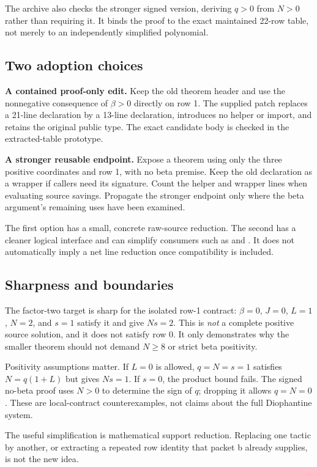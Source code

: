 \documentclass[10pt,a4paper]{article}
\newcommand{\code}[1]{\texttt{\detokenize{#1}}}
\begin{document}
The archive also checks the stronger signed version, deriving $q>0$ from $N>0$ rather than requiring it. It binds the proof to the exact maintained 22-row table, not merely to an independently simplified polynomial.

\subsection{Two adoption choices}

\textbf{A contained proof-only edit.} Keep the old theorem header and use the nonnegative consequence of $\beta>0$ directly on row 1. The supplied patch replaces a 21-line declaration by a 13-line declaration, introduces no helper or import, and retains the original public type. The exact candidate body is checked in the extracted-table prototype.

\textbf{A stronger reusable endpoint.} Expose a theorem using only the three positive coordinates and row 1, with no beta premise. Keep the old declaration as a wrapper if callers need its signature. Count the helper and wrapper lines when evaluating source savings. Propagate the stronger endpoint only where the beta argument's remaining uses have been examined.

The first option has a small, concrete raw-source reduction. The second has a cleaner logical interface and can simplify consumers such as \code{source_rank_half_lt} and \code{source_base_separation}. It does not automatically imply a net line reduction once compatibility is included.

\subsection{Sharpness and boundaries}

The factor-two target is sharp for the isolated row-1 contract: $\beta=0$, $J=0$, $L=1$, $N=2$, and $s=1$ satisfy it and give $Ns=2$. This is \emph{not} a complete positive source solution, and it does not satisfy row 0. It only demonstrates why the smaller theorem should not demand $N\ge8$ or strict beta positivity.

Positivity assumptions matter. If $L=0$ is allowed, $q=N=s=1$ satisfies $N=q(1+L)$ but gives $Ns=1$. If $s=0$, the product bound fails. The signed no-beta proof uses $N>0$ to determine the sign of $q$; dropping it allows $q=N=0$. These are local-contract counterexamples, not claims about the full Diophantine system.

The useful simplification is mathematical support reduction. Replacing one tactic by another, or extracting a repeated row identity that packet b already supplies, is not the new idea.
\end{document}
